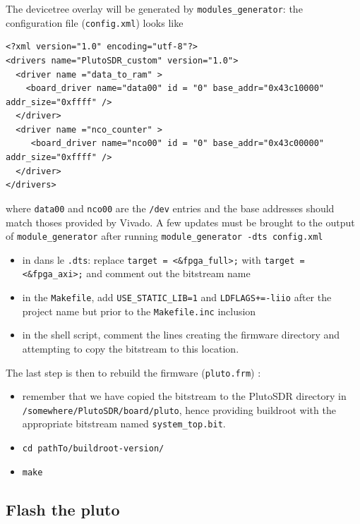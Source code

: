\documentclass{article}
\begin{document}
The devicetree overlay will be generated by {\tt modules\_generator}: the configuration
file ({\tt config.xml}) looks like
{\footnotesize
\begin{verbatim}
<?xml version="1.0" encoding="utf-8"?>
<drivers name="PlutoSDR_custom" version="1.0">
  <driver name ="data_to_ram" >
    <board_driver name="data00" id = "0" base_addr="0x43c10000" addr_size="0xffff" />
  </driver>
  <driver name ="nco_counter" >
     <board_driver name="nco00" id = "0" base_addr="0x43c00000" addr_size="0xffff" />
  </driver>
</drivers>
\end{verbatim}
}
where {\tt data00} and {\tt nco00} are the {\tt /dev} entries and the base addresses
should match thoses provided by Vivado. A few updates must be brought to the output
of {\tt module\_generator} after running {\tt module\_generator -dts config.xml}
\begin{itemize}
\item in dans le {\tt .dts}: replace \verb~target = <&fpga_full>;~ with \verb~target = <&fpga_axi>;~ 
and comment out the bitstream name
\item in the {\tt Makefile}, add {\tt USE\_STATIC\_LIB=1} and {\tt LDFLAGS+=-liio} after the project
name but prior to the {\tt Makefile.inc} inclusion
\item in the shell script, comment the lines creating the firmware directory and attempting to copy
the bitstream to this location.
\end{itemize}

The last step is then to rebuild the firmware ({\tt pluto.frm}) :

\begin{itemize}
	\item remember that we have copied the bitstream to the PlutoSDR
directory in \\
{\tt /somewhere/PlutoSDR/board/pluto}, hence providing buildroot with the appropriate
bitstream named {\tt system\_top.bit}.
	\item {\tt cd pathTo/buildroot-version/}
	\item {\tt make}
\end{itemize}

\subsection{Flash the pluto}
\end{document}
